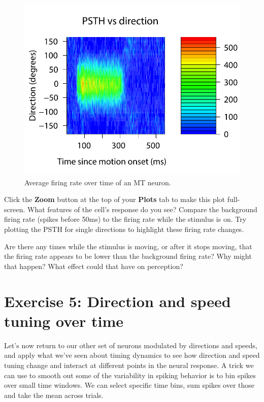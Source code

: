 \documentclass[
letterpaper, %
11pt, %
 oneside, 
onecolumn, %
]{memoir}
\numberwithin{Exercise}{chapter}
\begin{document}
\begin{figure}
\centering
\includegraphics[scale=0.7]{PSTH} 
\caption{Average firing rate over time of an MT neuron.}
\end{figure}
Click the \textbf{Zoom} button at the top of your \textbf{Plots} tab to make this plot full-screen. What features of the cell's response do you see?  Compare the background firing rate (spikes before 50ms) to the firing rate while the stimulus is on.   Try plotting the PSTH for single directions to highlight these firing rate changes. 

Are there any times while the stimulus is moving, or after it stops moving, that the firing rate appears to be lower than the background firing rate? Why might that happen? What effect could that have on perception?

\section{Exercise 5:  Direction and speed tuning over time }   

Let's now return to our other set of neurons modulated by directions and speeds, and apply what we've seen about timing dynamics to see how direction and speed tuning change and interact at different points in the neural response.  
A trick we can use to smooth out some of the variability in spiking behavior is to bin spikes over small time windows. 
We can select specific time bins, sum spikes over those and take the mean across trials. 
\end{document}
